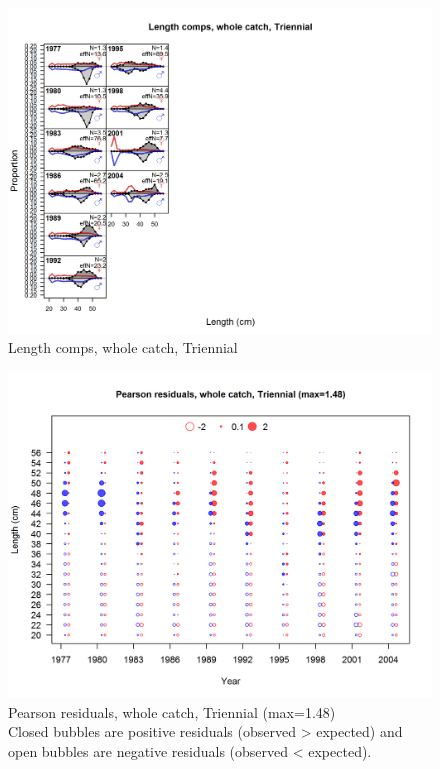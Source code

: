 \documentclass[12pt,]{article}
\begin{document}
\begin{figure}[htbp]
\centering
\includegraphics{./r4ss/plots_mod1/comp_lenfit_flt5mkt0.png}
\caption{Length comps, whole catch, Triennial
\label{fig:mod1_22_comp_lenfit_flt5mkt0}}
\end{figure}

\begin{figure}[htbp]
\centering
\includegraphics{./r4ss/plots_mod1/comp_lenfit_residsflt5mkt0.png}
\caption{Pearson residuals, whole catch, Triennial (max=1.48)\\
Closed bubbles are positive residuals (observed \textgreater{} expected)
and open bubbles are negative residuals (observed \textless{} expected).
\label{fig:mod1_23_comp_lenfit_residsflt5mkt0}}
\end{figure}
\end{document}
